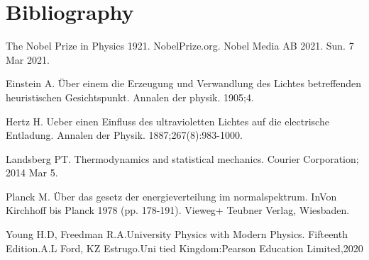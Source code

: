 \documentclass[12pt]{article}
\begin{document}
\section{Bibliography}
\begin{thebibliography}{}
   
     The Nobel Prize in Physics 1921. NobelPrize.org. Nobel Media AB 2021. Sun. 7 Mar 2021.
   
     Einstein A. Über einem die Erzeugung und Verwandlung des Lichtes betreffenden heuristischen Gesichtspunkt. Annalen der physik. 1905;4.
   
     Hertz H. Ueber einen Einfluss des ultravioletten Lichtes auf die electrische Entladung. Annalen der Physik. 1887;267(8):983-1000.
   
    Landsberg PT. Thermodynamics and statistical mechanics. Courier Corporation; 2014 Mar 5.
   
    Planck M. Über das gesetz der energieverteilung im normalspektrum. InVon Kirchhoff bis Planck 1978 (pp. 178-191). Vieweg+ Teubner Verlag, Wiesbaden.
   
     Young H.D, Freedman R.A.University Physics with Modern Physics. Fifteenth Edition.A.L Ford, KZ Estrugo.Uni tied Kingdom:Pearson Education Limited,2020
\end{thebibliography}

    
    


    
\end{document}
